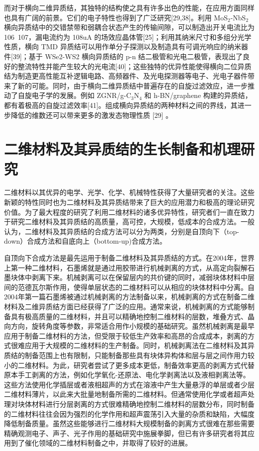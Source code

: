 而对于横向二维异质结，其独特的结构使之具有许多出色的性能，在应用方面同样也具有广阔的前景。它们的电子特性也得到了广泛研究[29,38]。利用 MoS$_2$-NbS$_2$ 横向异质结中的交错禁带和弱耦合状态产生的传输间隙，可以制造出开关电流比为 106~107，漏电流约为 108uA 的场效应晶体管[25]；利用其纳米尺寸和多组分光学性质，横向 TMD 异质结可以用作单分子探测以及制造具有可调光响应的纳米器件[39]；基于 WSe2-WS2 横向异质结的 p-n 结二极管和光电二极管，表现出了良好的整流特性并能产生较大的光电流[40]；这些独特的优异性能使得横向二位异质结为制造更高性能互补逻辑电路、高频器件、及光电探测器等电子、光电子器件带来了新的可能。同时，由于横向二维异质结中普遍存在的自旋过滤效应，进一步推动了自旋电子学的发展。例如 ZGNR/g-C$_3$N$_4$ 和 h-BN/graphene 构建的异质结，都有着极高的自旋过滤效率[41]。组成横向异质结的两种材料之间的界线，其进一步降低的维数还可以带来更多的激发态物理性质 [29] 。

\section{二维材料及其异质结的生长制备和机理研究}
二维材料以其优异的电学、光学、化学、机械特性获得了大量研究者的关注。这些新颖的特性同时也为二维材料及其异质结带来了巨大的应用潜力和极高的理论研究价值。为了最大程度的研究了利用二维材料的诸多优异特性，研究者们一直在致力于研究二维材料及其异质结的高质量，高可控，大规模，低成本的合成方法。一般认为，二维材料及其异质结的合成方法可以分为两类，分别是自顶向下（top-down）合成方法和自底向上（bottom-up)合成方法。%

自顶向下合成方法是最先运用于制备二维材料及其异质结的方式。在2004年，世界上第一种二维材料，石墨烯就是通过用胶带进行机械剥离的方式，从高定向裂解石墨块体中剥离下来。机械剥离可以在保留层内的共价键的同时，减弱块体材料中层间的范德瓦尔斯作用，使得单层状态的二维材料可以从相应的块体材料中分离。自2004年第一篇石墨烯被通过机械剥离的方法制备以来，机械剥离的方式在制备二维材料及二维异质结方面已经获得了广泛的应用。通常来说，机械剥离的方式能够制备具有极高质量的二维材料，并且可以精确地控制二维材料的层数，堆叠方式、晶向方向，旋转角度等参数，非常适合用作小规模的基础研究。虽然机械剥离是最早应用于制备二维材料的方法，但受限于较低生产效率和高昂的合成成本，剥离的方式很难应用于大规模的二维材料的生产制备。同时，机械剥离法在二维材料及其异质结的制备范围上也有限制，只能制备那些具有块体异构体和层与层之间作用力较小的二维材料。为此，研究者尝试了更多成本更低，制备效率更高的剥离方式代替原本手工剥离的方法，例如化学氧化-还原法、电化学剥离法以及液相剥离法等。这些方法使用化学插层或者液相超声的方式在溶液中产生大量悬浮的单层或者少层二维材料薄片，以此来大批量地制备所需的二维材料。但通常使用化学或者超声处理对块体材料进行分层剥离的方式很难精确地控制二维材料的层数分布，同时制备的二维材料往往会因为强烈的化学作用和超声震荡引入大量的杂质和缺陷，大幅度降低制备质量。虽然这些能够进行二维材料大规模制备的剥离方式很难在那些需要精确观测电子、声子、光子作用的基础研究中施展拳脚，但已有许多研究者将其应用到了催化领域的二维材料制备之中，并取得了较好的进展。


